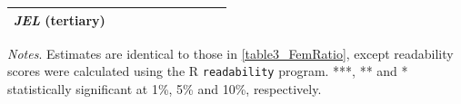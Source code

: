 \begin{table}
\begin{threeparttable}
\begin{tabular}{p{3cm}S@{}S@{}S@{}S@{}S@{}S@{}S@{}S@{}S@{}}
            \textit{JEL} (tertiary)       &               &               &               &               &               &               &               &               &           {}   \\
            \bottomrule
        \end{tabular}
        \begin{tablenotes}
            \tiny
            \item \textit{Notes}. Estimates are identical to those in \autoref{table3_FemRatio}, except readability scores were calculated using the R \texttt{readability} program. ***, ** and * statistically significant at 1\%, 5\% and 10\%, respectively.
        \end{tablenotes}
    \end{threeparttable}

\end{table}

